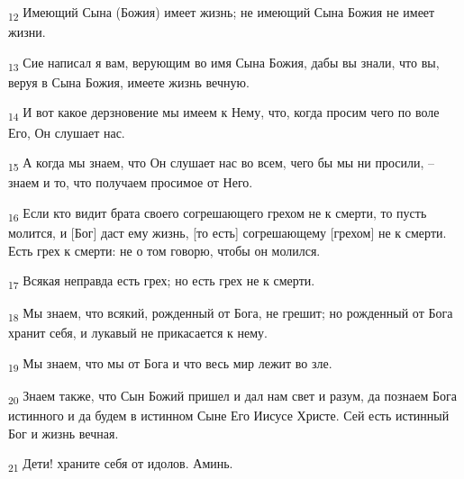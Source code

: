 \begin{tcolorbox}
\textsubscript{12} Имеющий Сына (Божия) имеет жизнь; не имеющий Сына Божия не имеет жизни.
\end{tcolorbox}
\begin{tcolorbox}
\textsubscript{13} Сие написал я вам, верующим во имя Сына Божия, дабы вы знали, что вы, веруя в Сына Божия, имеете жизнь вечную.
\end{tcolorbox}
\begin{tcolorbox}
\textsubscript{14} И вот какое дерзновение мы имеем к Нему, что, когда просим чего по воле Его, Он слушает нас.
\end{tcolorbox}
\begin{tcolorbox}
\textsubscript{15} А когда мы знаем, что Он слушает нас во всем, чего бы мы ни просили, --знаем и то, что получаем просимое от Него.
\end{tcolorbox}
\begin{tcolorbox}
\textsubscript{16} Если кто видит брата своего согрешающего грехом не к смерти, то пусть молится, и [Бог] даст ему жизнь, [то есть] согрешающему [грехом] не к смерти. Есть грех к смерти: не о том говорю, чтобы он молился.
\end{tcolorbox}
\begin{tcolorbox}
\textsubscript{17} Всякая неправда есть грех; но есть грех не к смерти.
\end{tcolorbox}
\begin{tcolorbox}
\textsubscript{18} Мы знаем, что всякий, рожденный от Бога, не грешит; но рожденный от Бога хранит себя, и лукавый не прикасается к нему.
\end{tcolorbox}
\begin{tcolorbox}
\textsubscript{19} Мы знаем, что мы от Бога и что весь мир лежит во зле.
\end{tcolorbox}
\begin{tcolorbox}
\textsubscript{20} Знаем также, что Сын Божий пришел и дал нам свет и разум, да познаем Бога истинного и да будем в истинном Сыне Его Иисусе Христе. Сей есть истинный Бог и жизнь вечная.
\end{tcolorbox}
\begin{tcolorbox}
\textsubscript{21} Дети! храните себя от идолов. Аминь.
\end{tcolorbox}
